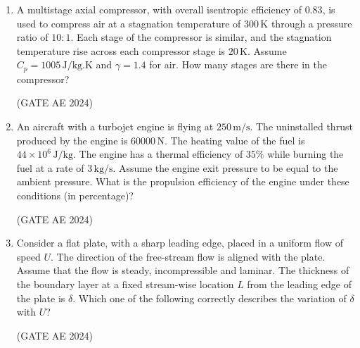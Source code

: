 \documentclass[journal,12pt,onecolumn]{IEEEtran}
\theoremstyle{remark}
\begin{document}
\begin{enumerate}
\item A multistage axial compressor, with overall isentropic efficiency of $0.83$, is used to compress air at a stagnation temperature of $300 \, \text{K}$ through a pressure ratio of $10{:}1$. Each stage of the compressor is similar, and the stagnation temperature rise across each compressor stage is $20 \, \text{K}$. Assume $C_p = 1005 \, \text{J/kg.K}$ and $\gamma = 1.4$ for air. How many stages are there in the compressor?  
\begin{enumerate}
\end{enumerate}
\hfill(GATE AE 2024)

\item An aircraft with a turbojet engine is flying at $250 \, \text{m/s}$. The uninstalled thrust produced by the engine is $60000 \, \text{N}$. The heating value of the fuel is $44 \times 10^6 \, \text{J/kg}$. The engine has a thermal efficiency of $35\%$ while burning the fuel at a rate of $3 \, \text{kg/s}$. Assume the engine exit pressure to be equal to the ambient pressure. What is the propulsion efficiency of the engine under these conditions (in percentage)?  
\begin{enumerate}
\end{enumerate}
\hfill(GATE AE 2024)


\item Consider a flat plate, with a sharp leading edge, placed in a uniform flow of speed $U$. The direction of the free-stream flow is aligned with the plate. Assume that the flow is steady, incompressible and laminar. The thickness of the boundary layer at a fixed stream-wise location $L$ from the leading edge of the plate is $\delta$. Which one of the following correctly describes the variation of $\delta$ with $U$?  
\begin{enumerate}
\end{enumerate}
\hfill(GATE AE 2024)



\end{enumerate}
\end{document}
